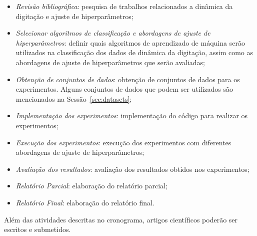 \begin{itemize}
    \item \textit{Revisão bibliográfica}: pesquisa de trabalhos relacionados a dinâmica da digitação e ajuste de hiperparâmetros;
    \item \textit{Selecionar algoritmos de classificação e abordagens de ajuste de hiperparâmetros}: definir quais algoritmos de aprendizado de máquina serão utilizados na classificação dos dados de dinâmica da digitação, assim como as abordagens de ajuste de hiperparâmetros que serão avaliadas;
    \item \textit{Obtenção de conjuntos de dados}: obtenção de conjuntos de dados para os experimentos. Alguns conjuntos de dados que podem ser utilizados são mencionados na Sessão~\ref{sec:datasets};
    \item \textit{Implementação dos experimentos}: implementação do código para realizar os experimentos;
    \item \textit{Execução dos experimentos}: execução dos experimentos com diferentes abordagens de ajuste de hiperparâmetros;
    \item \textit{Avaliação dos resultados}: avaliação dos resultados obtidos nos experimentos;
    \item \textit{Relatório Parcial}: elaboração do relatório parcial;
    \item \textit{Relatório Final}: elaboração do relatório final.
\end{itemize}

Além das atividades descritas no cronograma, artigos científicos poderão ser escritos e submetidos.